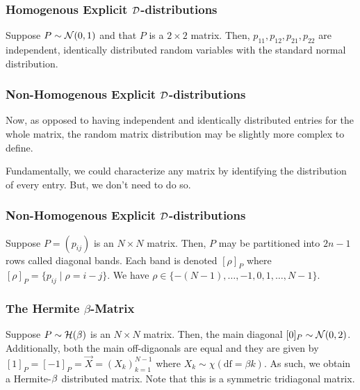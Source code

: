 \begin{frame} \frametitle{Homogenous Explicit $\mathcal{D}$-distributions}

  \begin{examples}
  Suppose $P \sim \mathcal{N}(0,1)$ and that $P$ is a $2 \times 2$ matrix.
  Then, $p_{11}, p_{12}, p_{21}, p_{22}$ are independent, identically distributed random variables with the standard normal distribution.
  \end{examples}

\end{frame}
\begin{frame} \frametitle{Non-Homogenous Explicit $\mathcal{D}$-distributions}

Now, as opposed to having independent and identically distributed entries for the whole matrix, the random matrix distribution may be slightly more complex to define. \newline

Fundamentally, we could characterize any matrix by identifying the distribution of every entry. But, we don't need to do so.

\end{frame}
\begin{frame} \frametitle{Non-Homogenous Explicit $\mathcal{D}$-distributions}

  \begin{alertblock}{}
    Suppose $P = (p_{ij})$ is an $N \times N$ matrix. Then, $P$ may be partitioned into $2n - 1$ rows called diagonal bands. Each band is denoted $[\rho]_P$ where $[\rho]_P = \{p_{ij} \mid \rho = i - j\}$. We have
    $\rho \in \{ -(N-1), \dots, -1, 0, 1, \dots, N-1 \}$.
  \end{alertblock}

\end{frame}
\begin{frame} \frametitle{The Hermite $\beta$-Matrix}

  \begin{alertblock}{}
    Suppose $P \sim \mathcal{H}(\beta)$ is an $N \times N$ matrix. Then, the main diagonal $[0]_P \sim \mathcal{N}(0,2)$.
    Additionally, both the main off-digaonals are equal and they are given by $[1]_{P} = [-1]_{P} = \vec{X} = (X_k)_{k=1}^{N-1}$ where $X_k \sim \chi(\text{df} = \beta k)$.
    As such, we obtain a Hermite-$\beta$ distributed matrix. Note that this is a symmetric tridiagonal matrix.
  \end{alertblock}

\end{frame}
